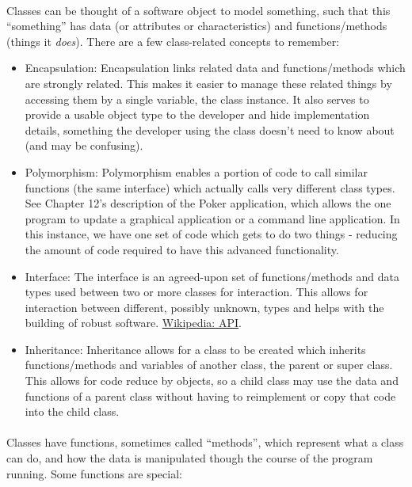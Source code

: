 \documentclass[letter,10pt]{article}
\begin{document}
\paragraph{}Classes can be thought of a software object to model something, such that this ``something'' has data (or attributes or characteristics) and functions/methods (things it \textit{does}). There are a few class-related concepts to remember:

\begin{itemize}
    \item Encapsulation: Encapsulation links related data and functions/methods which are strongly related. This makes it easier
to manage these related things by accessing them by a single variable, the class instance. It also serves to provide a usable object type to the developer and hide implementation details, something the developer using the class doesn't need to know about (and may be confusing).
    \item Polymorphism: Polymorphism enables a portion of code to call similar functions (the same interface) which actually
calls very different class types. See Chapter 12’s description of the Poker application, which allows
the one program to update a graphical application or a command line application. In this instance, we
have one set of code which gets to do two things - reducing the amount of code required to have this
advanced functionality.
    \item Interface: The interface is an agreed-upon set of functions/methods and data types used between two or more classes for interaction. This allows for interaction between different, possibly unknown, types and helps with the building of robust software. \href{https://en.wikipedia.org/wiki/API}{Wikipedia: API}.
    \item Inheritance: Inheritance allows for a class to be created which inherits functions/methods and variables of another
class, the parent or super class. This allows for code reduce by objects, so a child class may use the
data and functions of a parent class without having to reimplement or copy that code into the child
class.
\end{itemize}

\paragraph{}Classes have functions, sometimes called ``methods'', which represent what a class can do, and how the data is manipulated though the course of the program running. Some functions are special:
\end{document}
